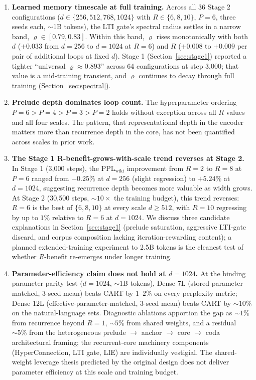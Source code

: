 \documentclass{article}
\newcommand{\cart}{\textsc{CART}}
\newcommand{\pplwiki}{PPL$_\text{wiki}$}
\begin{document}
\begin{enumerate}[leftmargin=*, topsep=2pt, itemsep=1pt]
  \item \textbf{Learned memory timescale at full training.} Across all 36 Stage 2 configurations ($d \in \{256, 512, 768, 1024\}$ with $R \in \{6, 8, 10\}$, $P{=}6$, three seeds each, $\sim$1B tokens), the LTI gate's spectral radius settles in a narrow band, $\varrho \in [0.79, 0.83]$. Within this band, $\varrho$ rises monotonically with both $d$ ($+0.033$ from $d{=}256$ to $d{=}1024$ at $R{=}6$) and $R$ ($+0.008$ to $+0.009$ per pair of additional loops at fixed $d$). Stage 1 (Section~\ref{sec:stage1}) reported a tighter ``universal $\varrho \approx 0.893$'' across 64 configurations at step 3{,}000; that value is a mid-training transient, and $\varrho$ continues to decay through full training (Section~\ref{sec:spectral}).
  \item \textbf{Prelude depth dominates loop count.} The hyperparameter ordering $P{=}6 > P{=}4 > P{=}3 > P{=}2$ holds without exception across all $R$ values and all four scales. The pattern, that representational depth in the encoder matters more than recurrence depth in the core, has not been quantified across scales in prior work.
  \item \textbf{The Stage 1 R-benefit-grows-with-scale trend reverses at Stage 2.} In Stage 1 (3{,}000 steps), the \pplwiki{} improvement from $R{=}2$ to $R{=}8$ at $P{=}6$ ranged from $-0.25\%$ at $d{=}256$ (slight regression) to $+5.24\%$ at $d{=}1024$, suggesting recurrence depth becomes more valuable as width grows. At Stage 2 (30{,}500 steps, $\sim 10\times$ the training budget), this trend reverses: $R{=}6$ is the best of $\{6, 8, 10\}$ at every scale $d \geq 512$, with $R{=}10$ regressing by up to $1\%$ relative to $R{=}6$ at $d{=}1024$. We discuss three candidate explanations in Section~\ref{sec:stage1} (prelude saturation, aggressive LTI-gate discard, and corpus composition lacking iteration-rewarding content); a planned extended-training experiment to 2.5B tokens is the cleanest test of whether $R$-benefit re-emerges under longer training.
  \item \textbf{Parameter-efficiency claim does not hold at $d{=}1024$.} At the binding parameter-parity test ($d{=}1024$, $\sim 1$B tokens), Dense 7L (stored-parameter-matched, 3-seed mean) beats \cart{} by $1$--$2\%$ on every perplexity metric; Dense 12L (effective-parameter-matched, 3-seed mean) beats \cart{} by $\sim 10\%$ on the natural-language sets. Diagnostic ablations apportion the gap as $\sim 1\%$ from recurrence beyond $R{=}1$, $\sim 5\%$ from shared weights, and a residual $\sim 5\%$ from the heterogeneous prelude $\to$ anchor $\to$ core $\to$ coda architectural framing; the recurrent-core machinery components (HyperConnection, LTI gate, LIE) are individually vestigial. The shared-weight leverage thesis predicted by the original design does not deliver parameter efficiency at this scale and training budget.
\end{enumerate}
\end{document}
